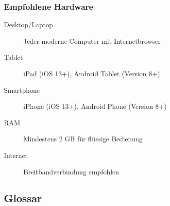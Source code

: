 \subsubsection{Empfohlene Hardware}

\begin{description}
    \item[Desktop/Laptop] Jeder moderne Computer mit Internetbrowser
    \item[Tablet] iPad (iOS 13+), Android Tablet (Version 8+)
    \item[Smartphone] iPhone (iOS 13+), Android Phone (Version 8+)
    \item[RAM] Mindestens 2 GB für flüssige Bedienung
    \item[Internet] Breitbandverbindung empfohlen
\end{description}

\subsection{Glossar}

